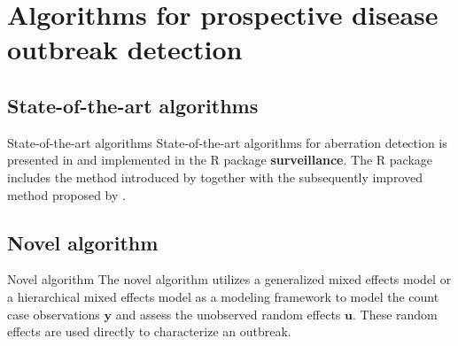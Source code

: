 \documentclass[aspectratio=169]{beamer}
\begin{document}
\hypertarget{algorithms-for-prospective-disease-outbreak-detection}{%
\section{Algorithms for prospective disease outbreak
detection}\label{algorithms-for-prospective-disease-outbreak-detection}}

\hypertarget{state-of-the-art-algorithms}{%
\subsection{State-of-the-art
algorithms}\label{state-of-the-art-algorithms}}

\begin{frame}{State-of-the-art algorithms}
State-of-the-art algorithms for aberration detection is presented in
\cite{Salmon_2016} and implemented in the R package
\textbf{surveillance}. The R package includes the method introduced by
\cite{Farrington_1996} together with the subsequently improved method
proposed by \cite{Noufaily_2013}.
\end{frame}

\hypertarget{novel-algorithm}{%
\subsection{Novel algorithm}\label{novel-algorithm}}

\begin{frame}{Novel algorithm}
The novel algorithm utilizes a generalized mixed effects model or a
hierarchical mixed effects model as a modeling framework to model the
count case observations \(\boldsymbol y\) and assess the unobserved
random effects \(\boldsymbol u\). These random effects are used directly
to characterize an outbreak.
\end{frame}
\end{document}
